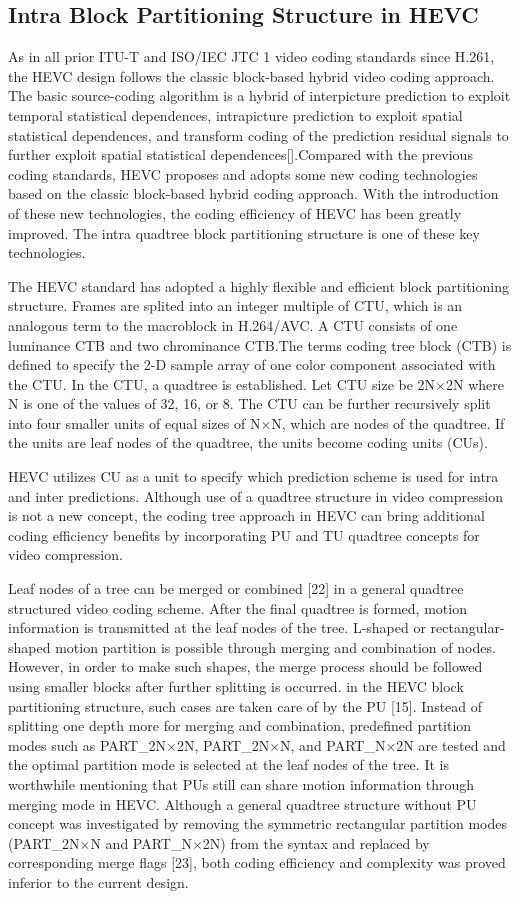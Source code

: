 \documentclass[journal,sort]{IEEEtran}
\begin{document}
\subsection{Intra Block Partitioning Structure in HEVC }
As in all prior ITU-T and ISO/IEC JTC 1 video coding
standards since H.261, the HEVC design follows the
classic block-based hybrid video coding approach. The basic source-coding algorithm is a hybrid
of interpicture prediction to exploit temporal statistical dependences,
intrapicture prediction to exploit spatial statistical
dependences, and transform coding of the prediction residual
signals to further exploit spatial statistical dependences[].Compared with the previous coding standards, HEVC proposes and adopts some new coding technologies based on  the classic block-based hybrid coding approach. With the introduction of these new technologies, the coding efficiency of HEVC has been greatly improved. The intra quadtree block partitioning structure is one of these key technologies.


The HEVC standard has adopted a highly flexible and efficient block partitioning structure. Frames are splited into an integer multiple of CTU, which is an analogous term to the macroblock in H.264/AVC. A CTU consists of one luminance CTB and two chrominance CTB.The terms coding
tree block (CTB) is defined to specify the 2-D sample array of one color component associated with the CTU. In the CTU, a quadtree is established. Let CTU size be 2N$\times$2N where N is one of the values of 32, 16, or 8. The CTU can be further recursively split into four smaller units of equal sizes of N$\times$N, which are nodes of the quadtree. If the
units are leaf nodes of the quadtree, the units become coding units (CUs).


HEVC utilizes CU as a unit to specify which prediction
scheme is used for intra and inter predictions. 
Although use of a quadtree structure in video compression is not a new concept, the coding tree approach in HEVC can bring additional coding efficiency benefits by incorporating PU and TU quadtree concepts for video compression.

Leaf nodes of a tree can be merged or combined [22] in a general quadtree structured video coding scheme. After the final quadtree is formed, motion information is transmitted at the leaf nodes of the tree. L-shaped or rectangular-shaped motion partition is possible through merging and combination of nodes. However, in order to make such shapes, the merge process should be followed using smaller blocks after further splitting is occurred. in the HEVC block partitioning structure, such cases are taken care of by the PU [15]. Instead of splitting one depth more for merging and combination, predefined partition modes such as PART\_2N×2N, PART\_2N×N, and PART\_N×2N are tested and the optimal partition mode is selected at the leaf nodes of the tree. It is worthwhile mentioning that PUs still can share motion information through merging mode in HEVC. Although a general quadtree structure without PU concept was investigated by removing the symmetric rectangular partition modes (PART\_2N×N and PART\_N×2N) from the syntax and replaced by corresponding merge flags [23], both coding efficiency and complexity was proved inferior to the current design.
\end{document}
